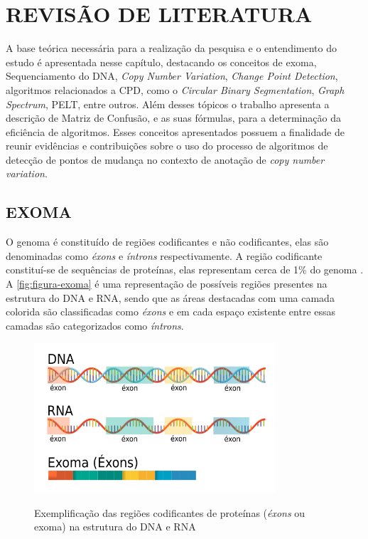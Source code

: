 
\chapter{REVISÃO DE LITERATURA}
\label{chap:fundamentacaoTeorica}

A base teórica necessária para a realização da pesquisa e o entendimento do estudo é apresentada nesse capítulo, destacando os conceitos de exoma, Sequenciamento do DNA, \textit{Copy Number Variation}, \textit{Change Point Detection}, algoritmos relacionados a CPD, como o \textit{Circular Binary Segmentation}, \textit{Graph Spectrum}, PELT, entre outros. Além desses tópicos o trabalho apresenta a descrição de Matriz de Confusão, e as suas fórmulas, para a determinação da eficiência de algoritmos. Esses conceitos apresentados possuem a finalidade de reunir evidências e contribuições sobre o uso do processo de algoritmos de detecção de pontos de mudança no contexto de anotação de \textit{copy number variation}.

\section{EXOMA}
\label{sec:exoma}

O genoma é constituído de regiões codificantes e não codificantes, elas são denominadas como \textit{éxons} e \textit{íntrons} respectivamente. A região codificante constituí-se de sequências de proteínas, elas representam cerca de 1\% do genoma \cite{Ng2009}. A \autoref{fig:figura-exoma} é uma representação de possíveis regiões presentes na estrutura do DNA e RNA, sendo que as áreas destacadas com uma camada colorida são classificadas como \textit{éxons} e em cada espaço existente entre essas camadas são categorizados como \textit{íntrons}.

\begin{figure}[!htb]
    \centering
    \caption{Exemplificação das regiões codificantes de proteínas (\textit{éxons} ou exoma) na estrutura do DNA e RNA}
    \includegraphics[width=0.8\textwidth]{./dados/figuras/exoma}
    \label{fig:figura-exoma}
\end{figure}

